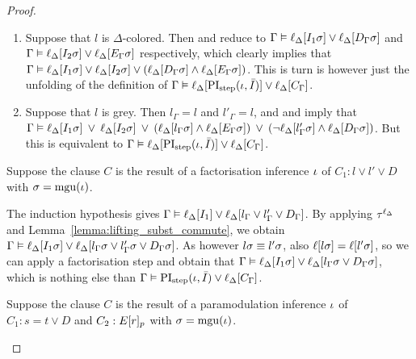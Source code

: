 \begin{proof}
\begin{indproof}
\begin{enumerate}
				\item Suppose that $l$ is $\Delta$-colored.
					Then \markA{} and \markB{} reduce to 
					$\Gamma \vDash \ell_{\Delta}[I_1\sigma] \lor \ell_{\Delta}[D_\Gamma\sigma]$
					and
					$\Gamma \vDash \ell_{\Delta}[I_2\sigma] \lor \ell_{\Delta}[E_\Gamma\sigma]$
					respectively,
					which clearly implies that 
					$\Gamma \vDash \ell_{\Delta}[I_1\sigma] \lor \ell_{\Delta}[I_2\sigma] \lor (\ell_{\Delta}[D_\Gamma\sigma] \land \ell_{\Delta}[E_\Gamma\sigma])$.
					This is turn is however just the unfolding of the definition of
					$\Gamma \vDash \ell_{\Delta}[\operatorname{PI}_{\mathrm{step}}(\iota, \bar I)] \lor \ell_{\Delta}[C_\Gamma]$.

				\item Suppose that $l$ is grey.
					Then $l_\Gamma = l$ and $l'_\Gamma = l$, and 
					\markA{} and \markB{} imply that
					$\Gamma \vDash
					\ell_{\Delta}[I_1\sigma] \;\,{\lor}\;\,
					\ell_{\Delta}[I_2\sigma] \;\,{\lor}\;\,\allowbreak
					(\ell_{\Delta}[l_\Gamma\sigma] \land \ell_{\Delta}[E_\Gamma\sigma]) \;\,{\lor}\;\,\allowbreak
					(\lnot\ell_{\Delta}[l'_\Gamma\sigma] \land \ell_{\Delta}[D_\Gamma\sigma])$.
					But this is equivalent to
					$\Gamma \vDash \ell_{\Delta}[\operatorname{PI}_{\mathrm{step}}(\iota, \bar I)] \lor \ell_{\Delta}[C_\Gamma]$.

			\end{enumerate}


			Suppose the clause $C$ is the result of a factorisation inference $\iota$ of $C_1: l \lor l' \lor D$ with $\sigma=\operatorname{mgu}(\iota)$.

			The induction hypothesis gives $\Gamma \vDash \ell_{\Delta}[ I_1 ] \lor \ell_{\Delta}[ l_\Gamma \lor l'_\Gamma \lor D_\Gamma ]$.
			By applying $\tau^{\ell_\Delta}$
			and Lemma~\ref{lemma:lifting_subst_commute}, we obtain
			$\Gamma \vDash \ell_{\Delta}[ I_1\sigma ] \lor \ell_{\Delta}[ l_\Gamma\sigma \lor l'_\Gamma\sigma \lor D_\Gamma\sigma ]$.
			As however $l\sigma \equiv l'\sigma$, 
			also $\ell[l\sigma] = \ell[l'\sigma]$, so we can apply a factorisation step and obtain that
			$\Gamma \vDash \ell_{\Delta}[ I_1\sigma ] \lor \ell_{\Delta}[ l_\Gamma\sigma \lor D_\Gamma\sigma ]$,
			which is nothing else than $\Gamma \vDash \operatorname{PI}_{\mathrm{step}}(\iota, \bar I) \lor \ell_{\Delta}[C_\Gamma]$.

			Suppose the clause $C$ is the result of a paramodulation inference\nolinebreak{} $\iota$ of $C_1: s=t \lor D$ and $C_2: E{[r]_{p}}$ with $\sigma=\operatorname{mgu}(\iota)$.


\end{indproof}
\end{proof}
